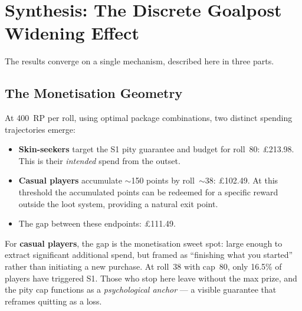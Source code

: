 \documentclass[11pt, a4paper]{article}
\begin{document}


\section{Synthesis: The Discrete Goalpost Widening Effect}
\label{sec:synthesis}

The results converge on a single mechanism, described here in three
parts.

\subsection{The Monetisation Geometry}
\label{sec:synthesis-geometry}

At 400~RP per roll, using optimal package combinations, two
distinct spending trajectories emerge:

\begin{itemize}[nosep]
    \item \textbf{Skin-seekers} target the S1 pity guarantee and
          budget for roll~80: \pounds213.98. This is their
          \emph{intended} spend from the outset.
    \item \textbf{Casual players} accumulate $\sim$150 points by
          roll~$\sim$38: \pounds102.49. At this threshold the
          accumulated points can be redeemed for a specific reward
          outside the loot system, providing a natural exit point.
    \item The gap between these endpoints: \pounds111.49.
\end{itemize}

For \textbf{casual players}, the gap is the monetisation sweet spot:
large enough to extract significant additional spend, but framed as
``finishing what you started'' rather than initiating a new purchase.
At roll~38 with cap~80, only 16.5\% of players have triggered S1.
Those who stop here leave without the max prize, and the pity cap
functions as a \emph{psychological anchor} --- a visible guarantee
that reframes quitting as a loss.
\end{document}
